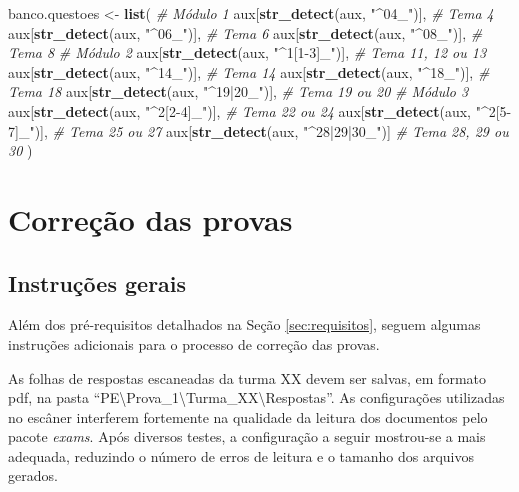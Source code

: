 \documentclass[a4paper]{report}
\newenvironment{Shaded}{\begin{snugshade}}{\end{snugshade}}
\newcommand{\KeywordTok}[1]{\textcolor[rgb]{0.13,0.29,0.53}{\textbf{#1}}}
\newcommand{\StringTok}[1]{\textcolor[rgb]{0.31,0.60,0.02}{#1}}
\newcommand{\CommentTok}[1]{\textcolor[rgb]{0.56,0.35,0.01}{\textit{#1}}}
\newcommand{\NormalTok}[1]{#1}
\begin{document}
\begin{Shaded}
\begin{Highlighting}[]
\NormalTok{banco.questoes <-}\StringTok{ }\KeywordTok{list}\NormalTok{(}
  \CommentTok{# Módulo 1}
\NormalTok{  aux[}\KeywordTok{str_detect}\NormalTok{(aux, }\StringTok{"^04_"}\NormalTok{)], }\CommentTok{# Tema 4}
\NormalTok{  aux[}\KeywordTok{str_detect}\NormalTok{(aux, }\StringTok{"^06_"}\NormalTok{)], }\CommentTok{# Tema 6}
\NormalTok{  aux[}\KeywordTok{str_detect}\NormalTok{(aux, }\StringTok{"^08_"}\NormalTok{)], }\CommentTok{# Tema 8}
  \CommentTok{# Módulo 2}
\NormalTok{  aux[}\KeywordTok{str_detect}\NormalTok{(aux, }\StringTok{"^1[1-3]_"}\NormalTok{)], }\CommentTok{# Tema 11, 12 ou 13}
\NormalTok{  aux[}\KeywordTok{str_detect}\NormalTok{(aux, }\StringTok{"^14_"}\NormalTok{)], }\CommentTok{# Tema 14}
\NormalTok{  aux[}\KeywordTok{str_detect}\NormalTok{(aux, }\StringTok{"^18_"}\NormalTok{)], }\CommentTok{# Tema 18}
\NormalTok{  aux[}\KeywordTok{str_detect}\NormalTok{(aux, }\StringTok{"^19|20_"}\NormalTok{)], }\CommentTok{# Tema 19 ou 20 }
  \CommentTok{# Módulo 3}
\NormalTok{  aux[}\KeywordTok{str_detect}\NormalTok{(aux, }\StringTok{"^2[2-4]_"}\NormalTok{)], }\CommentTok{# Tema 22 ou 24}
\NormalTok{  aux[}\KeywordTok{str_detect}\NormalTok{(aux, }\StringTok{"^2[5-7]_"}\NormalTok{)], }\CommentTok{# Tema 25 ou 27}
\NormalTok{  aux[}\KeywordTok{str_detect}\NormalTok{(aux, }\StringTok{"^28|29|30_"}\NormalTok{)] }\CommentTok{# Tema 28, 29 ou 30}
\NormalTok{)}
\end{Highlighting}
\end{Shaded}

\section{Correção das provas}

\subsection{Instruções gerais} \label{subsec:configuracoes}

Além dos pré-requisitos detalhados na Seção \ref{sec:requisitos}, seguem
algumas instruções adicionais para o processo de correção das provas.

As folhas de respostas escaneadas da turma XX devem ser salvas, em
formato pdf, na pasta
``PE\textbackslash{}Prova\_1\textbackslash{}Turma\_XX\textbackslash{}Respostas''.
As configurações utilizadas no escâner interferem fortemente na
qualidade da leitura dos documentos pelo pacote \emph{exams}. Após
diversos testes, a configuração a seguir mostrou-se a mais adequada,
reduzindo o número de erros de leitura e o tamanho dos arquivos gerados.
\end{document}

